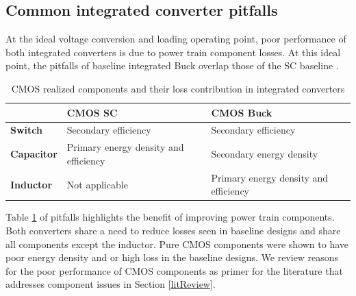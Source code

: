 \documentclass[letterpaper,twocolumn,10pt]{article}
\begin{document}
\subsection{Common integrated converter pitfalls}\label{CommCvrtrPitfalls}

At the ideal voltage conversion and loading operating point, poor performance of both integrated converters is due to power train component losses. At this ideal point, the pitfalls of baseline integrated Buck \cite{Alimadadi2008} overlap those of the SC baseline \cite{Viraj2007}. %

\begin{table}
\centering
    \begin{tabular}{|l|l|l|}
    \hline
    ~         & \textbf{CMOS SC} \cite{Viraj2007}                         & \textbf{CMOS Buck} \cite{Alimadadi2008}                       \\ \hline
    \textbf{Switch}    & Secondary efficiency                  & Secondary efficiency                  \\ \hline
    \textbf{Capacitor} & Primary energy density and efficiency & Secondary energy density              \\ \hline
    \textbf{Inductor}  & Not applicable                        & Primary energy density and efficiency \\ \hline
    \end{tabular}
    \caption{CMOS realized components and their loss contribution in integrated converters}
    \label{PitfallTable}    
\end{table}

Table \ref{PitfallTable} of pitfalls highlights the benefit of improving power train components. Both converters share a need to reduce losses seen in baseline designs and share all components except the inductor. Pure CMOS components were shown to have poor energy density and or high loss in the baseline designs. We review reasons for the poor performance of CMOS components as primer for the literature that addresses component issues in Section \ref{litReview}.\\%
\end{document}
